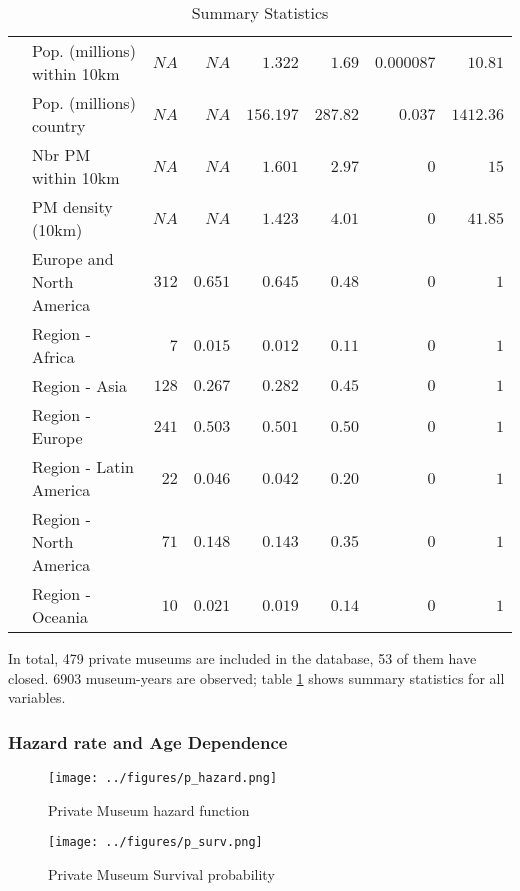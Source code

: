 \documentclass[12pt]{article}
\begin{document}
\begin{table}[ht]
\begin{tabular}{llrrrrrr}
   & Pop. (millions) within 10km & $NA$ & $NA$ & $  1.322$ & $  1.69$ & $0.000087$ & $10.81$ \\ 
   & Pop. (millions) country & $NA$ & $NA$ & $156.197$ & $287.82$ & $0.037$ & $1412.36$ \\ 
   & Nbr PM within 10km & $NA$ & $NA$ & $  1.601$ & $  2.97$ & $0$ & $15$ \\ 
   & PM density (10km) & $NA$ & $NA$ & $  1.423$ & $  4.01$ & $0$ & $41.85$ \\ 
   & Europe and North America & $312$ & $0.651$ & $  0.645$ & $  0.48$ & $0$ & $1$ \\ 
   & Region - Africa & $7$ & $0.015$ & $  0.012$ & $  0.11$ & $0$ & $1$ \\ 
   & Region - Asia & $128$ & $0.267$ & $  0.282$ & $  0.45$ & $0$ & $1$ \\ 
   & Region - Europe & $241$ & $0.503$ & $  0.501$ & $  0.50$ & $0$ & $1$ \\ 
   & Region - Latin America & $22$ & $0.046$ & $  0.042$ & $  0.20$ & $0$ & $1$ \\ 
   & Region - North America & $71$ & $0.148$ & $  0.143$ & $  0.35$ & $0$ & $1$ \\ 
   & Region - Oceania & $10$ & $0.021$ & $  0.019$ & $  0.14$ & $0$ & $1$ \\ 
   \hline
\end{tabular}
\caption{Summary Statistics} 
\label{tbl:t_sumstats}
\end{table}

In total, 479 private museums are included in the database, 53 of them have closed.
6903 museum-years are observed; table \ref{tbl:t_sumstats} shows summary statistics for all variables.

\subsubsection*{Hazard rate and Age Dependence}
\label{sec:org01e6edd}

\begin{figure}[htbp]
\centering
\texttt{[image: ../figures/p\_hazard.png]}
\caption{\label{fig:p_hazard}Private Museum hazard function}
\end{figure}

\begin{figure}[htbp]
\centering
\texttt{[image: ../figures/p\_surv.png]}
\caption{\label{fig:p_surv}Private Museum Survival probability}
\end{figure}
\end{document}
